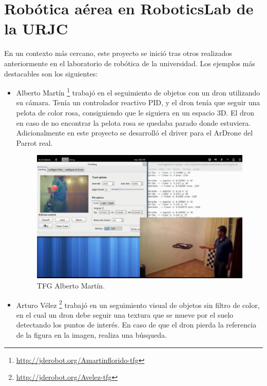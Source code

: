 \section{Robótica aérea en RoboticsLab de la URJC}
En un contexto más cercano, este proyecto se inició tras otros realizados
anteriormente en el laboratorio de robótica de la universidad. Los ejemplos más
destacables son los siguientes:
\begin{itemize}
\item Alberto Martín\cite{albertoMartin} \footnote{\url{http://jderobot.org/Amartinflorido-tfg}} trabajó en el seguimiento de objetos con un dron
utilizando su cámara. Tenía un controlador reactivo PID, y el dron tenía que seguir una pelota de color rosa, consiguiendo que le siguiera en un espacio 3D. El dron en caso de no encontrar la pelota rosa se quedaba parado donde estuviera. Adicionalmente en este proyecto se desarrolló el driver para el ArDrone del Parrot real.

\begin{figure}[H]
  \centering
  \includegraphics[scale=0.6]{imagenes/AlbertoMartin.png}
  \caption{TFG Alberto Martín.}
  \label{fig:albertoMartin}
\end{figure}


\item Arturo Vélez\cite{arturoVelez} \footnote{\url{http://jderobot.org/Avelez-tfg}} trabajó en un seguimiento visual de objetos sin filtro de color, en el cual un dron debe seguir una textura que se mueve por el suelo detectando los puntos de interés. En caso de que el dron pierda la referencia de la figura en la imagen, realiza una búsqueda.


\end{itemize}
